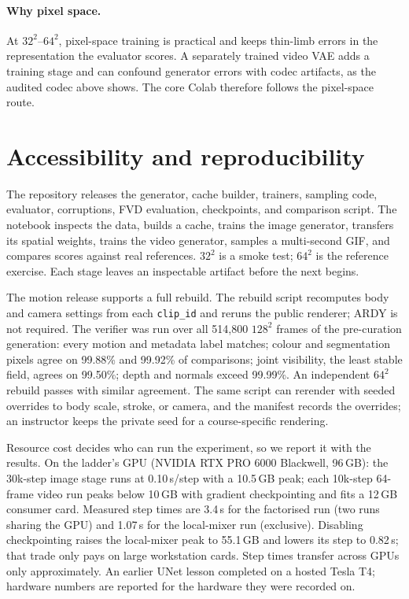 \documentclass[10pt,twocolumn]{article}
\begin{document}
\paragraph{Why pixel space.} At $32^2$--$64^2$, pixel-space training is practical and keeps thin-limb errors in
the representation the evaluator scores. A separately trained video VAE adds a training stage and can confound
generator errors with codec artifacts, as the audited codec above shows. The core Colab therefore follows the
pixel-space route.

\section{Accessibility and reproducibility}\label{sec:access}
The repository releases the generator, cache builder, trainers, sampling code, evaluator, corruptions, FVD
evaluation, checkpoints, and comparison script. The notebook inspects the data, builds a cache, trains the
image generator, transfers its spatial weights, trains the video generator, samples a multi-second GIF, and
compares scores against real references. $32^2$ is a smoke test; $64^2$ is the reference exercise. Each stage
leaves an inspectable artifact before the next begins.

The motion release supports a full rebuild. The rebuild script recomputes body and camera settings from each
\texttt{clip\_id} and reruns the public renderer; ARDY is not required. The verifier was run over all 514,800
$128^2$ frames of the pre-curation generation: every motion and metadata label matches; colour and segmentation
pixels agree on 99.88\% and 99.92\% of comparisons; joint visibility, the least stable field, agrees on
99.50\%; depth and normals exceed 99.99\%. An independent $64^2$ rebuild passes with similar agreement. The
same script can rerender with seeded overrides to body scale, stroke, or camera, and the manifest records the
overrides; an instructor keeps the private seed for a course-specific rendering.

Resource cost decides who can run the experiment, so we report it with the results. On the ladder's GPU
(NVIDIA RTX PRO 6000 Blackwell, 96\,GB): the 30k-step image stage runs at 0.10\,s/step with a 10.5\,GB peak;
each 10k-step 64-frame video run peaks below 10\,GB with gradient checkpointing and fits a 12\,GB consumer
card. Measured step times are 3.4\,s for the factorised run (two runs sharing the GPU) and 1.07\,s for the
local-mixer run (exclusive). Disabling checkpointing raises the local-mixer peak to 55.1\,GB and lowers its
step to 0.82\,s; that trade only pays on large workstation cards. Step times transfer across GPUs only
approximately. An earlier UNet lesson completed on a hosted Tesla T4; hardware numbers are reported for the
hardware they were recorded on.
\end{document}

